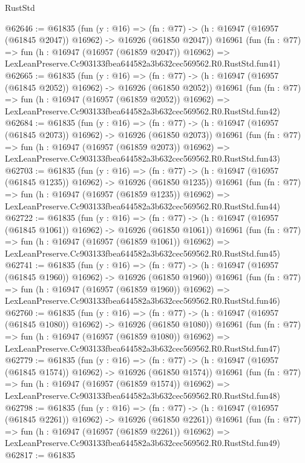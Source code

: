 \begin{lexlean}{RustStd}
\begin{coremodule}
@62646 := @61835
    (fun (y : @16) =>
    (fn : @77) -> (h : @16947 (@16957 (@61845 @2047)) @16962) -> @16926 (@61850 @2047))
    @16961
    (fun (fn : @77) =>
    fun (h : @16947 (@16957 (@61859 @2047)) @16962) =>
    LexLeanPreserve.Cc903133fbea644582a3b632cec569562.R0.RustStd.fun41)
@62665 := @61835
    (fun (y : @16) =>
    (fn : @77) -> (h : @16947 (@16957 (@61845 @2052)) @16962) -> @16926 (@61850 @2052))
    @16961
    (fun (fn : @77) =>
    fun (h : @16947 (@16957 (@61859 @2052)) @16962) =>
    LexLeanPreserve.Cc903133fbea644582a3b632cec569562.R0.RustStd.fun42)
@62684 := @61835
    (fun (y : @16) =>
    (fn : @77) -> (h : @16947 (@16957 (@61845 @2073)) @16962) -> @16926 (@61850 @2073))
    @16961
    (fun (fn : @77) =>
    fun (h : @16947 (@16957 (@61859 @2073)) @16962) =>
    LexLeanPreserve.Cc903133fbea644582a3b632cec569562.R0.RustStd.fun43)
@62703 := @61835
    (fun (y : @16) =>
    (fn : @77) -> (h : @16947 (@16957 (@61845 @1235)) @16962) -> @16926 (@61850 @1235))
    @16961
    (fun (fn : @77) =>
    fun (h : @16947 (@16957 (@61859 @1235)) @16962) =>
    LexLeanPreserve.Cc903133fbea644582a3b632cec569562.R0.RustStd.fun44)
@62722 := @61835
    (fun (y : @16) =>
    (fn : @77) -> (h : @16947 (@16957 (@61845 @1061)) @16962) -> @16926 (@61850 @1061))
    @16961
    (fun (fn : @77) =>
    fun (h : @16947 (@16957 (@61859 @1061)) @16962) =>
    LexLeanPreserve.Cc903133fbea644582a3b632cec569562.R0.RustStd.fun45)
@62741 := @61835
    (fun (y : @16) =>
    (fn : @77) -> (h : @16947 (@16957 (@61845 @1960)) @16962) -> @16926 (@61850 @1960))
    @16961
    (fun (fn : @77) =>
    fun (h : @16947 (@16957 (@61859 @1960)) @16962) =>
    LexLeanPreserve.Cc903133fbea644582a3b632cec569562.R0.RustStd.fun46)
@62760 := @61835
    (fun (y : @16) =>
    (fn : @77) -> (h : @16947 (@16957 (@61845 @1080)) @16962) -> @16926 (@61850 @1080))
    @16961
    (fun (fn : @77) =>
    fun (h : @16947 (@16957 (@61859 @1080)) @16962) =>
    LexLeanPreserve.Cc903133fbea644582a3b632cec569562.R0.RustStd.fun47)
@62779 := @61835
    (fun (y : @16) =>
    (fn : @77) -> (h : @16947 (@16957 (@61845 @1574)) @16962) -> @16926 (@61850 @1574))
    @16961
    (fun (fn : @77) =>
    fun (h : @16947 (@16957 (@61859 @1574)) @16962) =>
    LexLeanPreserve.Cc903133fbea644582a3b632cec569562.R0.RustStd.fun48)
@62798 := @61835
    (fun (y : @16) =>
    (fn : @77) -> (h : @16947 (@16957 (@61845 @2261)) @16962) -> @16926 (@61850 @2261))
    @16961
    (fun (fn : @77) =>
    fun (h : @16947 (@16957 (@61859 @2261)) @16962) =>
    LexLeanPreserve.Cc903133fbea644582a3b632cec569562.R0.RustStd.fun49)
@62817 := @61835

\end{coremodule}
\end{lexlean}
